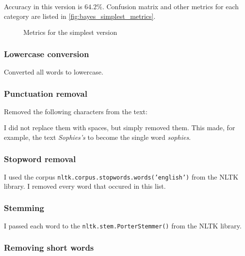 Accuracy in this version is $64.2\%$. Confusion matrix and other metrics for each category are listed in \autoref{fig:bayes_simplest_metrics}.

\begin{figure}[htpb]
    \caption{Metrics for the simplest version}
    \label{fig:bayes_simplest_metrics}
    \begin{tcolorbox}
        
    \end{tcolorbox}
\end{figure}

\subsubsection{Lowercase conversion}
\label{sec:bayes_lowercase}

Converted all words to lowercase.

\subsubsection{Punctuation removal}
\label{sec:bayes_punctuation}

Removed the following characters from the text:


I did not replace them with spaces, but simply removed them. This made, for example, the text \emph{Sophies's} to become the single word \emph{sophies}.

\subsubsection{Stopword removal}
\label{sec:bayes_stopwords}

I used the corpus \texttt{nltk.corpus.stopwords.words('english')} from the NLTK library. I removed every word that occured in this list.

\subsubsection{Stemming}
\label{sec:bayes_stemming}

I passed each word to the \texttt{nltk.stem.PorterStemmer()} from the NLTK library.

\subsubsection{Removing short words}
\label{sec:bayes_shortwords}

